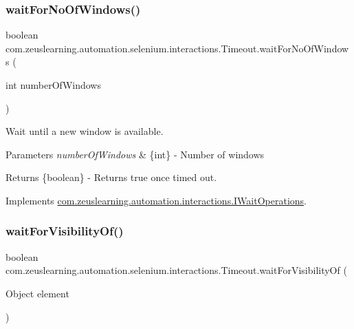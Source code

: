 \subsubsection{\texorpdfstring{wait\+For\+No\+Of\+Windows()}{waitForNoOfWindows()}}
{\footnotesize\ttfamily boolean com.\+zeuslearning.\+automation.\+selenium.\+interactions.\+Timeout.\+wait\+For\+No\+Of\+Windows (\begin{DoxyParamCaption}\item[{int}]{number\+Of\+Windows }\end{DoxyParamCaption})\hspace{0.3cm}{\ttfamily [inline]}}

Wait until a new window is available.


\begin{DoxyParams}{Parameters}
{\em number\+Of\+Windows} & \{int\} -\/ Number of windows \\
\hline
\end{DoxyParams}
\begin{DoxyReturn}{Returns}
\{boolean\} -\/ Returns {\ttfamily true} once timed out. 
\end{DoxyReturn}


Implements \hyperlink{interfacecom_1_1zeuslearning_1_1automation_1_1interactions_1_1IWaitOperations_a609fd66e35b8217e83f499999785b370}{com.\+zeuslearning.\+automation.\+interactions.\+I\+Wait\+Operations}.

\hypertarget{classcom_1_1zeuslearning_1_1automation_1_1selenium_1_1interactions_1_1Timeout_a327e77cb8ede06a2f7eef9d765812b7a}{}\label{classcom_1_1zeuslearning_1_1automation_1_1selenium_1_1interactions_1_1Timeout_a327e77cb8ede06a2f7eef9d765812b7a} 
\subsubsection{\texorpdfstring{wait\+For\+Visibility\+Of()}{waitForVisibilityOf()}\hspace{0.1cm}{\footnotesize\ttfamily [1/2]}}
{\footnotesize\ttfamily boolean com.\+zeuslearning.\+automation.\+selenium.\+interactions.\+Timeout.\+wait\+For\+Visibility\+Of (\begin{DoxyParamCaption}\item[{Object}]{element }\end{DoxyParamCaption})\hspace{0.3cm}{\ttfamily [inline]}}

